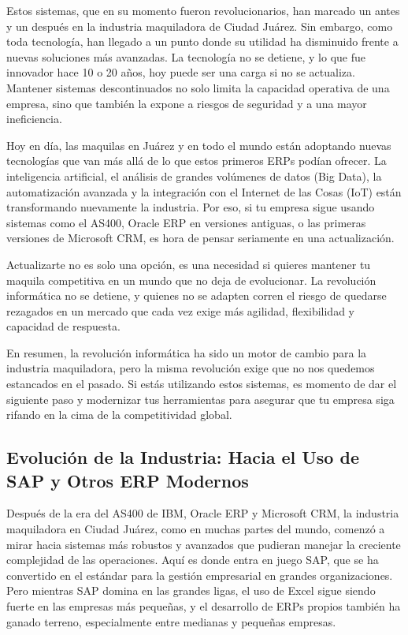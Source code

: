 \documentclass[
  10pt,
  letterpaper,
]{book}
\begin{document}
Estos sistemas, que en su momento fueron revolucionarios, han marcado un
antes y un después en la industria maquiladora de Ciudad Juárez. Sin
embargo, como toda tecnología, han llegado a un punto donde su utilidad
ha disminuido frente a nuevas soluciones más avanzadas. La tecnología no
se detiene, y lo que fue innovador hace 10 o 20 años, hoy puede ser una
carga si no se actualiza. Mantener sistemas descontinuados no solo
limita la capacidad operativa de una empresa, sino que también la expone
a riesgos de seguridad y a una mayor ineficiencia.

Hoy en día, las maquilas en Juárez y en todo el mundo están adoptando
nuevas tecnologías que van más allá de lo que estos primeros ERPs podían
ofrecer. La inteligencia artificial, el análisis de grandes volúmenes de
datos (Big Data), la automatización avanzada y la integración con el
Internet de las Cosas (IoT) están transformando nuevamente la industria.
Por eso, si tu empresa sigue usando sistemas como el AS400, Oracle ERP
en versiones antiguas, o las primeras versiones de Microsoft CRM, es
hora de pensar seriamente en una actualización.

Actualizarte no es solo una opción, es una necesidad si quieres mantener
tu maquila competitiva en un mundo que no deja de evolucionar. La
revolución informática no se detiene, y quienes no se adapten corren el
riesgo de quedarse rezagados en un mercado que cada vez exige más
agilidad, flexibilidad y capacidad de respuesta.

En resumen, la revolución informática ha sido un motor de cambio para la
industria maquiladora, pero la misma revolución exige que no nos
quedemos estancados en el pasado. Si estás utilizando estos sistemas, es
momento de dar el siguiente paso y modernizar tus herramientas para
asegurar que tu empresa siga rifando en la cima de la competitividad
global.

\subsection{Evolución de la Industria: Hacia el Uso de SAP y Otros ERP
Modernos}\label{evoluciuxf3n-de-la-industria-hacia-el-uso-de-sap-y-otros-erp-modernos}

Después de la era del AS400 de IBM, Oracle ERP y Microsoft CRM, la
industria maquiladora en Ciudad Juárez, como en muchas partes del mundo,
comenzó a mirar hacia sistemas más robustos y avanzados que pudieran
manejar la creciente complejidad de las operaciones. Aquí es donde entra
en juego SAP, que se ha convertido en el estándar para la gestión
empresarial en grandes organizaciones. Pero mientras SAP domina en las
grandes ligas, el uso de Excel sigue siendo fuerte en las empresas más
pequeñas, y el desarrollo de ERPs propios también ha ganado terreno,
especialmente entre medianas y pequeñas empresas.
\end{document}
